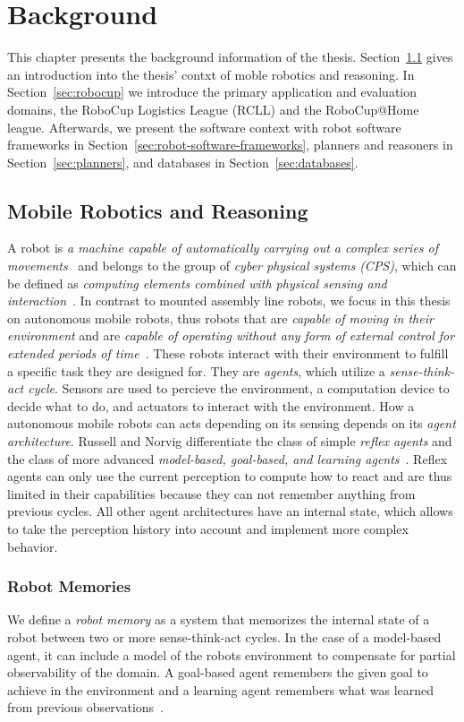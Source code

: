 \chapter{Background}
\label{sec:background}
This chapter presents the background information of the
thesis. Section~\ref{sec:mobile-robotics} gives an introduction into the
thesis' contxt of moble robotics and reasoning. In
Section~\ref{sec:robocup} we introduce the primary application and
evaluation domains, the RoboCup Logistics League (RCLL) and the
RoboCup@Home league. Afterwards, we present the software context with
robot software frameworks in
Section~\ref{sec:robot-software-frameworks}, planners and reasoners in
Section~\ref{sec:planners}, and databases in
Section~\ref{sec:databases}.

\section{Mobile Robotics and Reasoning}
\label{sec:mobile-robotics}
A robot is \emph{a machine capable of automatically carrying out a
  complex series of movements}~\cite{robot-dict} and belongs to the
group of \emph{cyber physical systems (CPS)}, which can be defined
as \emph{computing elements combined with physical sensing and
  interaction}~\cite{chapter-cps}. In contrast to mounted assembly
line robots, we focus in this thesis on autonomous mobile robots, thus
robots that are \emph{capable of moving in their environment} and
are \emph{capable of operating without any form of external control
  for extended periods of time}~\cite{autonomous-robots}. These robots
interact with their environment to fulfill a specific task they are
designed for. They are \emph{agents}, which utilize a
\emph{sense-think-act cycle}. Sensors are used to percieve the
environment, a computation device to decide what to do, and actuators
to interact with the environment. How a autonomous mobile robots can
acts depending on its sensing depends on its \emph{agent
  architecture}. Russell and Norvig differentiate the class of simple
\emph{reflex agents} and the class of more advanced
\emph{model-based, goal-based, and learning
  agents}~\cite{aimodern}. Reflex agents can only use the current
perception to compute how to react and are thus limited in their
capabilities because they can not remember anything from previous
cycles. All other agent architectures have an internal state, which
allows to take the perception history into account and implement more
complex behavior.

\subsection{Robot Memories}
\label{sec:robot-memories}
We define a \emph{robot memory} as a system that memorizes the
internal state of a robot between two or more sense-think-act
cycles. In the case of a model-based agent, it can include a model of
the robots environment to compensate for partial observability of the
domain. A goal-based agent remembers the given goal to achieve in the
environment and a learning agent remembers what was learned from
previous observations~\cite{aimodern}.

